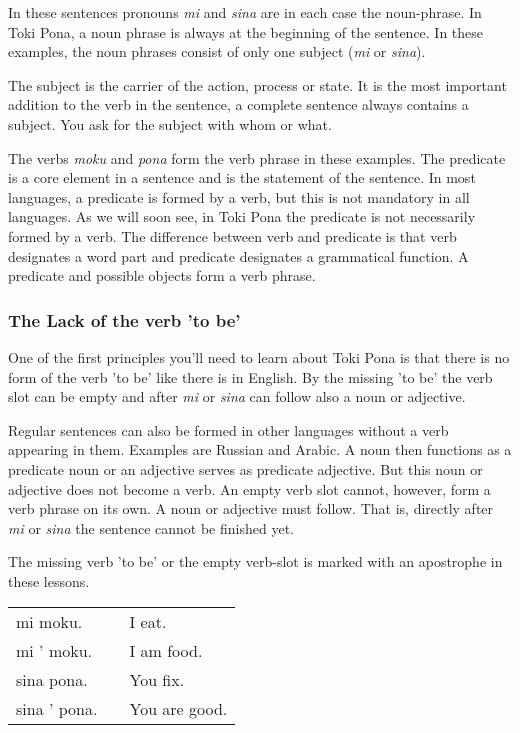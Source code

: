 In these sentences pronouns \textit{mi} and \textit{sina} are in each case the noun-phrase. 
In Toki Pona, a noun phrase is always at the beginning of the sentence. 
In these examples, the noun phrases consist of only one subject (\textit{mi} or \textit{sina}).

The subject is the carrier of the action, process or state. 
It is the most important addition to the verb in the sentence, a complete sentence always contains a subject. 
You ask for the subject with whom or what.

The verbs \textit{moku} and \textit{pona} form the verb phrase in these examples.  
The predicate is a core element in a sentence and is the statement of the sentence.
In most languages, a predicate is formed by a verb, but this is not mandatory in all languages. 
As we will soon see, in Toki Pona the predicate is not necessarily formed by a verb. 
The difference between verb and predicate is that verb designates a word part and predicate designates a grammatical function.
A predicate and possible objects form a verb phrase. 
%
\newpage
\subsubsection*{The Lack of the verb 'to be'}
%
One of the first principles you'll need to learn about Toki Pona is that there is no form of the verb 'to be' like there is in English. 
By the missing 'to be' the verb slot can be empty and after \textit{mi} or \textit{sina} can follow also a noun or adjective. 

Regular sentences can also be formed in other languages without a verb appearing in them. 
Examples are Russian and Arabic. 
A noun then functions as a predicate noun or an adjective serves as predicate adjective.
But this noun or adjective does not become a verb. 
An empty verb slot cannot, however, form a verb phrase on its own. 
A noun or adjective must follow. 
That is, directly after \textit{mi} or \textit{sina} the sentence cannot be finished yet.

The missing verb 'to be' or the empty verb-slot is marked with an apostrophe in these lessons. 

\begin{supertabular}{p{5cm}|ll}
mi moku. && I eat.  \\
mi ' moku. && I am food. \\  
sina pona. && You fix. \\
sina ' pona. && You are good. \\  
\end{supertabular} 

